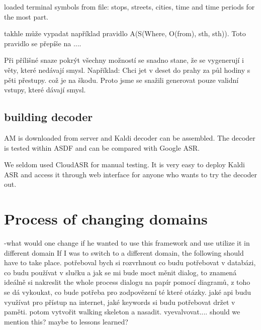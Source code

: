 loaded terminal symbols from file: stops, streets, cities, time and time periods for the most part.

takhle může vypadat například pravidlo A(S(Where, O(from), sth, sth)). 
Toto pravidlo se přepíše na .... 

Při přílišné snaze pokrýt všechny možností se snadno stane, že se vygenerují i věty, které nedávají smysl. Například: Chci jet v deset do prahy za půl hodiny s pěti přestupy. což je na škodu. Proto jsme se snažili generovat pouze validní vstupy, které dávají smysl.


\subsection{building decoder}

AM is downloaded from server and Kaldi decoder can be assembled.
The decoder is tested within ASDF and can be compared with Google ASR.

We seldom used CloudASR for manual testing. It is very easy to deploy Kaldi ASR and access it through web interface for anyone who wants to try the decoder out.


\section{Process of changing domains} 
  -what would one change if he wanted to use this framework and use utilize it in different domain
  If I was to switch to a different domain, the following should have to take place.
  potřeboval bych si rozvrhnout co budu potřebovat v databázi, co budu používat v slučku a jak se mi bude moct měnit dialog, to znamená ideálně si nakreslit the whole process dialogu na papír pomocí diagramů, z toho se dá vykoukat, co bude potřeba pro zodpovězení té které otázky. jaké api budu využívat pro přístup na internet, jaké keywords si budu potřebovat držet v paměti. potom vytvořit walking skeleton a nasadit. vyevalvovat....
  should we mention this? maybe to lessons learned?

  





